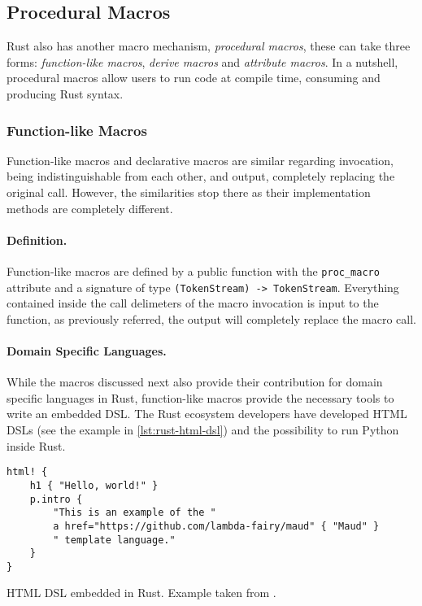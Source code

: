 \subsection{Procedural Macros}\label{sec:rust-macros:proc}
Rust also has another macro mechanism, \emph{procedural macros},
these can take three forms: \emph{function-like macros}, \emph{derive macros} and \emph{attribute macros}.
In a nutshell, procedural macros allow users to run code at compile time, consuming and producing Rust syntax.

\subsubsection*{Function-like Macros}
Function-like macros and declarative macros are similar regarding invocation, being indistinguishable from each other,
and output, completely replacing the original call.
However, the similarities stop there as their implementation methods are completely different.

\paragraph{Definition.}
Function-like macros are defined by a public function with the \texttt{proc\_macro} attribute and
a signature of type \texttt{(TokenStream) -> TokenStream}.
Everything contained inside the call delimeters of the macro invocation is input to the function,
as previously referred, the output will completely replace the macro call.

\paragraph{Domain Specific Languages.}
While the macros discussed next also provide their contribution for domain specific languages in Rust,
function-like macros provide the necessary tools to write an embedded DSL.
The Rust ecosystem developers have developed HTML DSLs \autocite{Wong2021, Stokke2021}
(see the example in \autoref{lst:rust-html-dsl}) and
the possibility to run Python inside Rust\autocite{Fusion2021}.

\begin{listing}
    \begin{verbatim}
html! {
    h1 { "Hello, world!" }
    p.intro {
        "This is an example of the "
        a href="https://github.com/lambda-fairy/maud" { "Maud" }
        " template language."
    }
}
    \end{verbatim}
    \caption{HTML DSL embedded in Rust. Example taken from \autocite{Wong2021}.}
    \label{lst:rust-html-dsl}
\end{listing}


